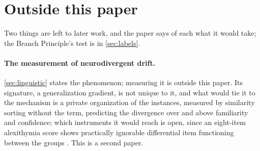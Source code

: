 \section{Outside this paper}
\label{sec:extensions}

Two things are left to later work, and the paper says of each what it would take; the Branch Principle's test is in \autoref{sec:labels}.

\paragraph{The measurement of neurodivergent drift.} \autoref{sec:linguistic} states the phenomenon; measuring it is outside this paper. Its signature, a generalization gradient, is not unique to it, and what would tie it to the mechanism is a private organization of the instances, measured by similarity sorting without the term, predicting the divergence over and above familiarity and confidence; which instruments it would reach is open, since an eight-item alexithymia score shows practically ignorable differential item functioning between the groups \cite{WilliamsGotham2021}. This is a second paper.
